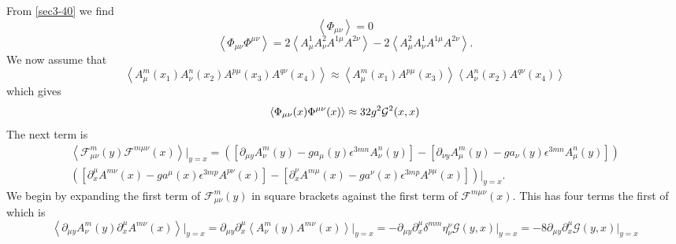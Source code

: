 \documentclass[a4paper,aps,showpacs]{revtex4}
\begin{document}
From \eqref{sec3-40} we find 
\begin{equation}
  \left\langle \Phi_{\mu \nu} \right\rangle = 0
\label{sec3-50}
\end{equation}
\begin{equation}
  \left\langle
  \Phi_{\mu\nu} \Phi^{\mu\nu}
  \right\rangle =
  2 \left\langle
  A^1_\mu A^2_\nu A^{1\mu} A^{2\nu}
  \right\rangle -
  2 \left\langle
  A^2_\mu A^1_\nu A^{1\mu} A^{2\nu}
  \right\rangle.
\label{sec3-60}
\end{equation}
We now assume that 
\begin{equation}
  \left\langle
  A^m_\mu(x_1) A^n_\nu(x_2) A^{p\mu}(x_3) A^{q\nu}(x_4) 
  \right\rangle \approx
  \left\langle
  A^m_\mu(x_1) A^{p \mu}(x_3)
  \right\rangle
  \left\langle
  A^n_\nu(x_2) A^{q \nu}(x_4)
  \right\rangle
\label{sec3-70}
\end{equation}
which gives
\begin{equation}
  \left\langle
  \Phi_{\mu\nu}(x) \Phi^{\mu\nu}(x) 
  \right\rangle \approx
  32 g^2 {\cal G}^2 (x,x)
\label{sec3-80}
\end{equation} 
The next term is
\begin{equation}
\begin{split}
  \left\langle
  \mathcal {F}^m_{\mu \nu} (y)
  \mathcal {F}^{m \mu \nu} (x)
  \right\rangle \Bigr |_{y=x} =
  \left(
    \left[
    \partial_{\mu y}A^m_\nu (y) -  g a_\mu (y)
      \epsilon^{3mn} A^n_\nu (y)
    \right] -
    \left[
    \partial_{\nu y}A^m_\mu (y) - g a_\nu (y)
      \epsilon^{3mn} A^n_\mu (y)
    \right]
  \right)
\\
  \left(
    \left[
    \partial^\mu_x A^{m \nu} (x) - g a^\mu (x)      
      \epsilon^{3mp} A^{p \nu} (x)
    \right] -
    \left[
    \partial^\nu_x A^{m \mu} (x) - g a^\nu (x)
      \epsilon^{3mp} A^{p \mu} (x)
    \right]
  \right) \Bigr |_{y=x} .
\end{split}
\label{sec3-90}
\end{equation}
We begin by expanding the first term of $\mathcal {F}^m_{\mu \nu} (y)$
in square brackets against the first term of $\mathcal {F}^{m \mu \nu} (x)$.
This has four terms the first of which is
\begin{equation}
  \left\langle
  \partial_{\mu y}A^m_\nu (y)
  \partial^\mu_xA^{m \nu} (x)
  \right\rangle \Bigr |_{y=x} =
  \partial_{\mu y} \partial^\mu_x
  \left\langle
  A^m_\nu (y) A^{m \nu} (x)
  \right\rangle \Bigr |_{y=x} =
  - \partial_{\mu y} \partial^\mu_x \delta^{mm} \eta^\nu_\nu
  \mathcal G (y,x) \Bigr |_{y=x} =
  - 8 \partial_{\mu y} \partial^\mu_x \mathcal G (y,x) \Bigr |_{y=x} 
\label{sec3-100}
\end{equation}
\end{document}
